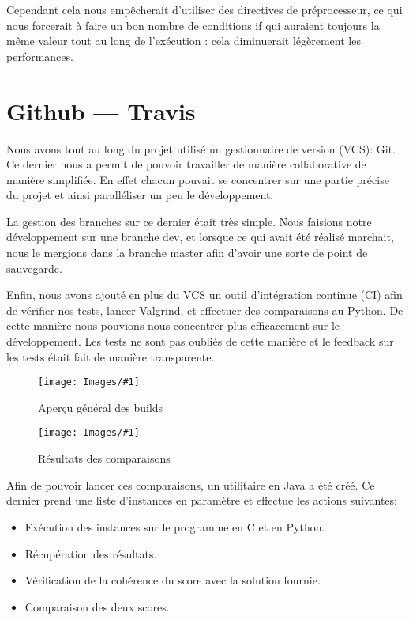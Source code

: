 \documentclass[hideweeklyreports]{polytech/polytech}
\newcommand{\img}[3]{%
	\begin{figure}[H]
		\centering
   		\texttt{[image: Images/\#1]}
  	 	\caption{#2}
	\end{figure}
}
\begin{document}
			Cependant cela nous empêcherait d'utiliser des directives de préprocesseur, ce qui nous forcerait à faire un bon nombre de conditions if qui auraient toujours la même valeur tout au long de l'exécution : cela diminuerait légèrement les performances.
		
		\section{Github — Travis}
			Nous avons tout au long du projet utilisé un gestionnaire de version (VCS): Git. Ce dernier nous a permit de pouvoir travailler de manière collaborative de manière simplifiée. En effet chacun pouvait se concentrer sur une partie précise du projet et ainsi paralléliser un peu le développement.
			
			La gestion des branches sur ce dernier était très simple. Nous faisions notre développement sur une branche dev, et lorsque ce qui avait été réalisé marchait, nous le mergions dans la branche master afin d'avoir une sorte de point de sauvegarde.
			
			Enfin, nous avons ajouté en plus du VCS un outil d'intégration continue (CI) afin de vérifier nos tests, lancer Valgrind, et effectuer des comparaisons au Python. De cette manière nous pouvions nous concentrer plus efficacement sur le développement. Les tests ne sont pas oubliés de cette manière et le feedback sur les tests était fait de manière transparente.
			\img{TravisAll.png}{Aperçu général des builds}{0.5}
			\img{TravisCompare.png}{Résultats des comparaisons}{0.575}
			
			Afin de pouvoir lancer ces comparaisons, un utilitaire en Java a été créé. Ce dernier prend une liste d'instances en paramètre et effectue les actions suivantes:
			\begin{itemize}
				\item Exécution des instances sur le programme en C et en Python.
				\item Récupération des résultats.
				\item Vérification de la cohérence du score avec la solution fournie.
				\item Comparaison des deux scores.
			\end{itemize}
			
\end{document}
